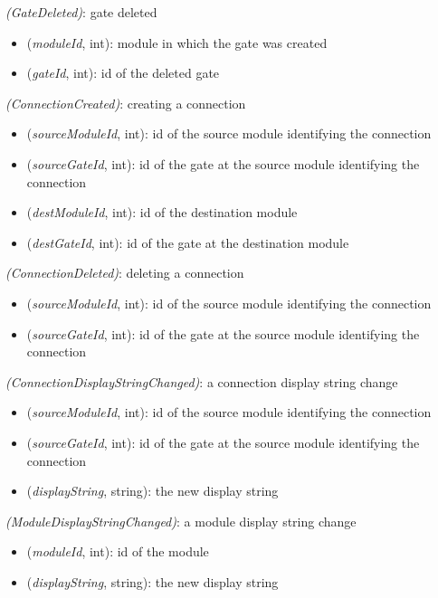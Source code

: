  \textit{(GateDeleted)}: gate deleted

\begin{itemize}
  \item {} (\textit{moduleId}, int): module in which the gate was created
  \item {} (\textit{gateId}, int): id of the deleted gate
\end{itemize}

 \textit{(ConnectionCreated)}: creating a connection

\begin{itemize}
  \item {} (\textit{sourceModuleId}, int): id of the source module identifying the connection
  \item {} (\textit{sourceGateId}, int): id of the gate at the source module identifying the connection
  \item {} (\textit{destModuleId}, int): id of the destination module
  \item {} (\textit{destGateId}, int): id of the gate at the destination module
\end{itemize}

 \textit{(ConnectionDeleted)}: deleting a connection

\begin{itemize}
  \item {} (\textit{sourceModuleId}, int): id of the source module identifying the connection
  \item {} (\textit{sourceGateId}, int): id of the gate at the source module identifying the connection
\end{itemize}

 \textit{(ConnectionDisplayStringChanged)}: a connection display string change

\begin{itemize}
  \item {} (\textit{sourceModuleId}, int): id of the source module identifying the connection
  \item {} (\textit{sourceGateId}, int): id of the gate at the source module identifying the connection
  \item {} (\textit{displayString}, string): the new display string
\end{itemize}

 \textit{(ModuleDisplayStringChanged)}: a module display string change

\begin{itemize}
  \item {} (\textit{moduleId}, int): id of the module
  \item {} (\textit{displayString}, string): the new display string
\end{itemize}

